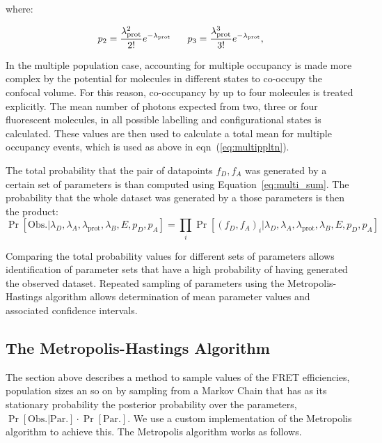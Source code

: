 where:

\begin{equation}
\footnotesize
p_2 = \frac{\lambda_{\text{prot}}^2}{2!}e^{-\lambda_{\text{prot}}} \qquad
p_3 = \frac{\lambda_{\text{prot}}^3}{3!}e^{-\lambda_{\text{prot}}} ,
\end{equation}

In the multiple population case, accounting for multiple occupancy is made more complex by the potential for molecules in different states to co-occupy the confocal volume. For this reason, co-occupancy by up to four molecules is treated explicitly. The mean number of photons expected from two, three or four fluorescent molecules, in all possible labelling and configurational states is calculated. These values are then used to calculate a total mean for multiple occupancy events, which is used as above in eqn~(\ref{eq:multippltn}). 

The total probability that the pair of datapoints $f_D, f_A$ was generated by a certain set of parameters is than computed using Equation~\ref{eq:multi_sum}. The probability that the whole dataset was generated by a those parameters is then the product:
\begin{equation}
\Pr[\text{Obs.}|\lambda_D, \lambda_A, \lambda_{\text{prot}}, \lambda_B, E, p_D, p_A] = \prod_i \Pr[(f_D, f_A)_i |\lambda_D, \lambda_A, \lambda_{\text{prot}}, \lambda_B, E, p_D, p_A]
\end{equation}

Comparing the total probability values for different sets of parameters allows identification of parameter sets that have a high probability of having generated the observed dataset. Repeated sampling of parameters using the Metropolis-Hastings algorithm allows determination of mean parameter values and associated confidence intervals.  

\subsection{The Metropolis-Hastings Algorithm}

The section above describes a method to sample values of the FRET efficiencies, population sizes an so on by sampling from a Markov Chain that has as its stationary probability the posterior probability over the parameters, $\Pr[\text{Obs.} | \text{Par.}] \cdot \Pr[\text{Par.}]$. We use a custom implementation of the Metropolis algorithm to achieve this. The Metropolis algorithm works as follows.

